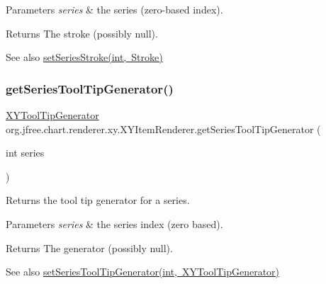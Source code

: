 \begin{DoxyParams}{Parameters}
{\em series} & the series (zero-\/based index).\\
\hline
\end{DoxyParams}
\begin{DoxyReturn}{Returns}
The stroke (possibly {\ttfamily null}).
\end{DoxyReturn}
\begin{DoxySeeAlso}{See also}
\mbox{\hyperlink{interfaceorg_1_1jfree_1_1chart_1_1renderer_1_1xy_1_1_x_y_item_renderer_a177adecc8b87f936d6efcdd31bae876b}{set\+Series\+Stroke(int, Stroke)}} 
\end{DoxySeeAlso}
\mbox{\label{interfaceorg_1_1jfree_1_1chart_1_1renderer_1_1xy_1_1_x_y_item_renderer_abd9e042bb8bfa4f20a45346e850710b8}} 
\subsubsection{\texorpdfstring{get\+Series\+Tool\+Tip\+Generator()}{getSeriesToolTipGenerator()}}
{\footnotesize\ttfamily \mbox{\hyperlink{interfaceorg_1_1jfree_1_1chart_1_1labels_1_1_x_y_tool_tip_generator}{X\+Y\+Tool\+Tip\+Generator}} org.\+jfree.\+chart.\+renderer.\+xy.\+X\+Y\+Item\+Renderer.\+get\+Series\+Tool\+Tip\+Generator (\begin{DoxyParamCaption}\item[{int}]{series }\end{DoxyParamCaption})}

Returns the tool tip generator for a series.


\begin{DoxyParams}{Parameters}
{\em series} & the series index (zero based).\\
\hline
\end{DoxyParams}
\begin{DoxyReturn}{Returns}
The generator (possibly {\ttfamily null}).
\end{DoxyReturn}
\begin{DoxySeeAlso}{See also}
\mbox{\hyperlink{interfaceorg_1_1jfree_1_1chart_1_1renderer_1_1xy_1_1_x_y_item_renderer_a4198dcc9fc6534f6373dad286980d12b}{set\+Series\+Tool\+Tip\+Generator(int, X\+Y\+Tool\+Tip\+Generator)}} 
\end{DoxySeeAlso}


